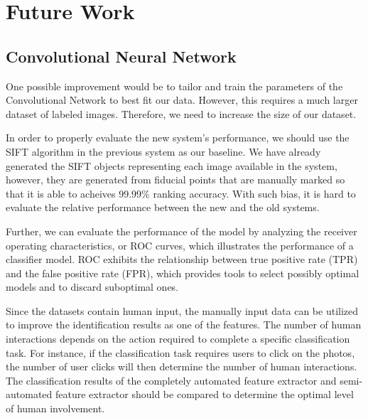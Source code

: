 \chapter{Future Work} %
\label{cha:future_work}

\section{Convolutional Neural Network}

One possible improvement would be to tailor and train the parameters of the
Convolutional Network to best fit our data. However, this requires a much
larger dataset of labeled images. Therefore, we need to increase the size of
our dataset.

In order to properly evaluate the new system's performance, we should use the
SIFT algorithm in the previous system as our baseline. We have already
generated the SIFT objects representing each image available in the system,
however, they are generated from fiducial points that are manually marked
so that it is able to acheives 99.99\% ranking accuracy. With such bias, it is
hard to evaluate the relative performance between the new and the old systems.

Further, we can evaluate the performance of the model by analyzing the receiver
operating characteristics, or ROC curves, which illustrates the
performance of a classifier model. ROC exhibits the relationship between true
positive rate (TPR) and the false positive rate (FPR), which provides tools to
select possibly optimal models and to discard suboptimal ones.

Since the datasets contain human input, the manually input data can be
utilized to improve the identification results as one of the features. The
number of human interactions depends on the action required to
complete a specific classification task. For instance, if the classification
task requires users to click on the photos, the number of user clicks will then
determine the number of human interactions. The classification results of the
completely automated feature extractor and semi-automated feature extractor
should be compared to determine the optimal level of human involvement.

